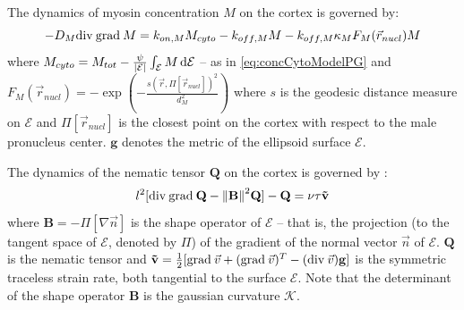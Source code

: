 The dynamics of myosin concentration $M$ on the cortex is governed by:
\begin{equation}\label{eq:dynamicsMyosinSurfaceModelMN}
    -D_M \mathrm{div}\:\mathrm{grad}\: M = k_{on,M}M_{cyto} - k_{off,M}M - k_{off,M}\kappa_MF_M(\vec{r}_{nucl})M
\end{equation}
where $M_{cyto} = M_{tot} - \frac{\psi}{\abs{\mathcal{E}}}\int_\mathcal{E} M \dd{\mathcal{E}}$ -- as in \autoref{eq:concCytoModelPG} and $F_M(\vec{r}_{nucl}) = -\exp(-\frac{s(\vec{r},\Pi[\vec{r}_{nucl}])^2}{d_M^2})$ where $s$ is the geodesic distance measure on $\mathcal{E}$ and $\Pi[\vec{r}_{nucl}]$ is the closest point on the cortex with respect to the male pronucleus center. $\mathbf{g}$ denotes the metric of the ellipsoid surface $\mathcal{E}$.

The dynamics of the nematic tensor $\mathbf{Q}$ on the cortex is governed by \citep{nitschke2018nematic}:
\begin{equation}\label{eq:dynamicsNematicsSurfaceModelMN}
    l^2[\mathrm{div}\:\mathrm{grad}\:\mathbf{Q} - \norm{\mathbf{B}}^2\mathbf{Q}] - \mathbf{Q} = \nu\tau \mathbf{\Tilde{v}}
\end{equation}
where $\mathbf{B} = -\Pi[\nabla\vec{n}]$ is the shape operator of $\mathcal{E}$ -- that is, the projection (to the tangent space of $\mathcal{E}$, denoted by $\Pi$) of the gradient of the normal vector $\vec{n}$ of $\mathcal{E}$. $\mathbf{Q}$ is the nematic tensor and $\mathbf{\Tilde{v}} = \frac{1}{2}[\mathrm{grad}\:\vec{v} + (\mathrm{grad}\:\vec{v})^T - (\mathrm{div}\:\vec{v})\mathbf{g}]$ is the symmetric traceless strain rate, both tangential to the surface $\mathcal{E}$. Note that the determinant of the shape operator $\mathbf{B}$ is the gaussian curvature $\mathcal{K}$.

